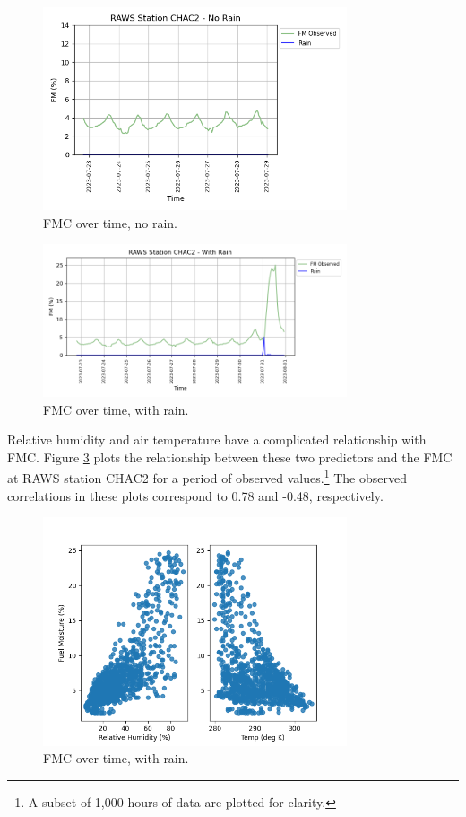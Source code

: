 \documentclass[11pt]{article}%
\begin{document}
\begin{figure}[ht]
    \centering
    \includegraphics[width=0.8\textwidth]{images/no_rain_plot.png}
    \caption{FMC over time, no rain.}
    \label{fig:fmc_no_rain}
\end{figure}

\begin{figure}[ht]
    \centering
    \includegraphics[width=0.8\textwidth]{images/rain_plot.png}
    \caption{FMC over time, with rain.}
    \label{fig:fmc_with_rain}
\end{figure}

Relative humidity and air temperature have a complicated relationship with FMC. Figure \ref{fig:rh_temp_plot} plots the relationship between these two predictors and the FMC at RAWS station CHAC2 for a period of observed values.\footnote{A subset of 1,000 hours of data are plotted for clarity.} The observed correlations in these plots correspond to 0.78 and -0.48, respectively. 

\begin{figure}[ht]
    \centering
    \includegraphics[width=0.8\textwidth]{images/rh_temp_plot.png}
    \caption{FMC over time, with rain.}
    \label{fig:rh_temp_plot}
\end{figure}
\end{document}
